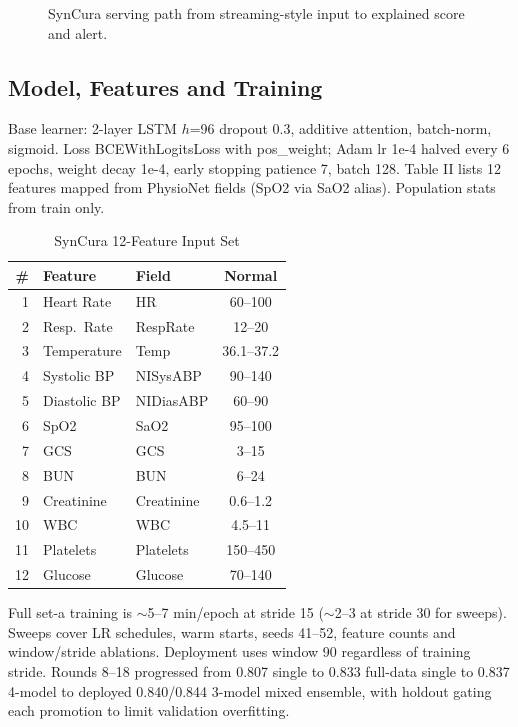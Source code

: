 \documentclass[a4paper,conference]{IEEEtran}
\begin{document}
\begin{figure}[htbp]
\centering
{} 
\caption{SynCura serving path from streaming-style input to explained score and alert.}
\label{fig:arch}
\end{figure}

\subsection{Model, Features and Training}
Base learner: 2-layer LSTM $h$=96 dropout 0.3, additive attention, batch-norm, sigmoid. Loss BCEWithLogitsLoss with pos\_weight; Adam lr 1e-4 halved every 6 epochs, weight decay 1e-4, early stopping patience 7, batch 128. Table II lists 12 features mapped from PhysioNet fields (SpO2 via SaO2 alias). Population stats from train only.

\begin{table}[htbp]
\caption{SynCura 12-Feature Input Set}
\label{tab:feats}
\centering
\footnotesize
\begin{tabular}{rllc}
\toprule
\# & Feature & Field & Normal \\
\midrule
1 & Heart Rate & HR & 60--100 \\
2 & Resp.\ Rate & RespRate & 12--20 \\
3 & Temperature & Temp & 36.1--37.2 \\
4 & Systolic BP & NISysABP & 90--140 \\
5 & Diastolic BP & NIDiasABP & 60--90 \\
6 & SpO2 & SaO2 & 95--100 \\
7 & GCS & GCS & 3--15 \\
8 & BUN & BUN & 6--24 \\
9 & Creatinine & Creatinine & 0.6--1.2 \\
10 & WBC & WBC & 4.5--11 \\
11 & Platelets & Platelets & 150--450 \\
12 & Glucose & Glucose & 70--140 \\
\bottomrule
\end{tabular}
\end{table}

Full set-a training is $\sim$5--7 min/epoch at stride 15 ($\sim$2--3 at stride 30 for sweeps). Sweeps cover LR schedules, warm starts, seeds 41--52, feature counts and window/stride ablations. Deployment uses window 90 regardless of training stride. Rounds 8--18 progressed from 0.807 single to 0.833 full-data single to 0.837 4-model to deployed 0.840/0.844 3-model mixed ensemble, with holdout gating each promotion to limit validation overfitting.
\end{document}
